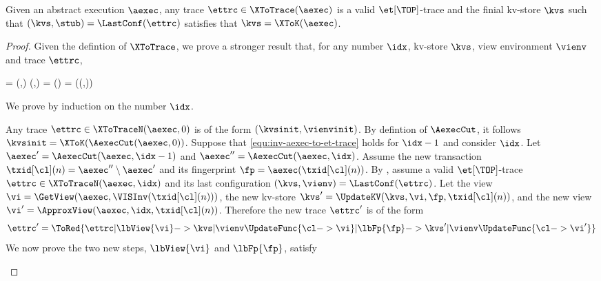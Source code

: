 \begin{toappendix}
\label{sec:proof-well-formed-aexec-to-et-trace}
\end{toappendix}
\begin{theoremrep}
\label{thm:aexec-to-et-top-trace}
Given an abstract execution \( \aexec \),
any trace \( \ettrc \in \XToTrace(\aexec) \) is a valid {\( \et[\TOP]\)}-trace
and the finial kv-store \( \kvs \) such that \( (\kvs,\stub) = \LastConf(\ettrc) \) satisfies
that \( \kvs = \XToK(\aexec) \).
\end{theoremrep}
\begin{proof}
Given the defintion of \( \XToTrace \), we prove a stronger result that,
for any number \( \idx \), kv-store \( \kvs \), view environment \( \vienv \) and trace \( \ettrc \),
\begin{Formulae}
\begin{Formula}
\ettrc = \XToTraceN(\aexec,\idx) \land (\kvs,\vienv) = \LastConf(\ettrc) 
        \land \kvs = \XToK(\AexecCut(\aexec,\idx))
\label{equ:inv-aexec-to-et-trace}
\end{Formula}
\end{Formulae}
We prove by induction on the number \( \idx \).
\begin{enumerate}
    Any trace \( \ettrc \in \XToTraceN(\aexec,0) \) is of the form \( (\kvsinit, \vienvinit) \).
    By defintion of \( \AexecCut \), it follows \( \kvsinit = \XToK(\AexecCut(\aexec,0)) \).
    Suppose that \cref{equ:inv-aexec-to-et-trace} holds for \( \idx - 1 \) and consider \( \idx \).
    Let \( \aexec' = \AexecCut(\aexec,\idx-1) \) and \( \aexec'' = \AexecCut(\aexec,\idx) \).
    Assume the new transaction \( \txid[\cl](n) = \aexec'' \setminus \aexec' \) 
    and its fingerprint \( \fp = \aexec(\txid[\cl](n)) \).
    By \ih, assume a valid \(\et[\TOP] \)-trace \( \ettrc \in \XToTraceN(\aexec,\idx) \)
    and its last configuration \( (\kvs,\vienv) = \LastConf(\ettrc)  \).
    Let the view \( \vi  = \GetView(\aexec,\VISInv(\txid[\cl](n))) \),
    the new kv-store \( \kvs' = \UpdateKV(\kvs,\vi,\fp,\txid[\cl](n)) \),
    and the new view \( \vi' = \ApproxView(\aexec,\idx, \txid[\cl](n)) \).
    Therefore the new trace \( \ettrc' \) is of the form
    \[
        \ettrc' = \ToRed{\ettrc | \lbView{\vi} 
                -> \kvs | \vienv\UpdateFunc{\cl -> \vi} | \lbFp{\fp}
                -> \kvs' | \vienv\UpdateFunc{\cl -> \vi'} }
    \]
    We now prove the two new steps, \( \lbView{\vi}\) and \( \lbFp{\fp} \), satisfy

\end{enumerate}
\end{proof}
